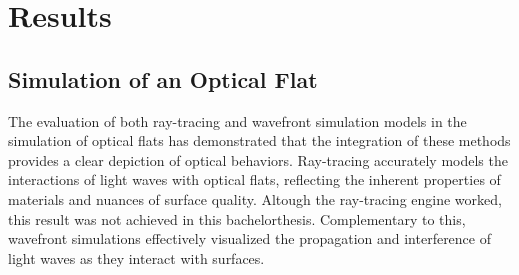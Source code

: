 \documentclass[../main.tex]{subfiles}
\begin{document}
{\let\clearpage\relax\chapter{Results}}
\vspace{-5pt}

\section{Simulation of an Optical Flat}
\vspace{-15pt}
The evaluation of both ray-tracing and wavefront simulation models in the simulation of optical flats has demonstrated that the integration of these methods provides a clear depiction of optical behaviors. Ray-tracing accurately models the interactions of light waves with optical flats, reflecting the inherent properties of materials and nuances of surface quality. Altough the ray-tracing engine worked, this result was not achieved in this bachelorthesis. Complementary to this, wavefront simulations effectively visualized the propagation and interference of light waves as they interact with surfaces.
\vspace{-15pt}
\end{document}
